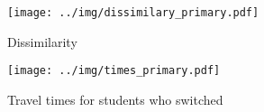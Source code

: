 \documentclass{article}
\begin{document}
\begin{figure*}[h]
\centering
\hfill
\begin{subfigure}{\textwidth}
    \centering
    \texttt{[image: ../img/dissimilary\_primary.pdf]}
    \caption{Dissimilarity}
    \label{fig:dissimilarity_histogram}
\end{subfigure}
\hfill
\begin{subfigure}{\textwidth}
    \centering
    \texttt{[image: ../img/times\_primary.pdf]}
    \caption{Travel times for students who switched}
    \label{fig:travel_times_histogram}
\end{subfigure}
\hfill
\label{fig:overall_histograms}
\end{figure*}
\end{document}
